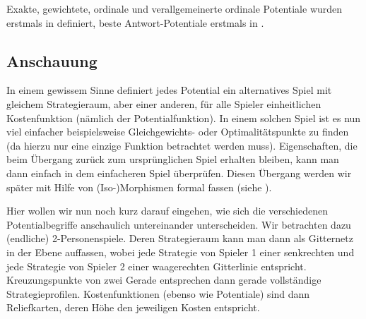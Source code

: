 Exakte, gewichtete, ordinale und verallgemeinerte ordinale Potentiale wurden erstmals in \cite{MonShap} definiert, beste Antwort-Potentiale erstmals in \cite{BestRespPot}.

\subsection{Anschauung}

In einem gewissem Sinne definiert jedes Potential ein alternatives Spiel mit gleichem Strategieraum, aber einer anderen, für alle Spieler einheitlichen Kostenfunktion (nämlich der Potentialfunktion). In einem solchen Spiel ist es nun viel einfacher beispielsweise Gleichgewichts- oder Optimalitätspunkte zu finden (da hierzu nur eine einzige Funktion betrachtet werden muss). Eigenschaften, die beim Übergang zurück zum ursprünglichen Spiel erhalten bleiben, kann man dann einfach in dem einfacheren Spiel überprüfen. Diesen Übergang werden wir später mit Hilfe von (Iso-)Morphismen formal fassen (siehe ).

Hier wollen wir nun noch kurz darauf eingehen, wie sich die verschiedenen Potentialbegriffe anschaulich untereinander unterscheiden. Wir betrachten dazu (endliche) 2-Personenspiele. Deren Strategieraum kann man dann als Gitternetz in der Ebene auffassen, wobei jede Strategie von Spieler 1 einer senkrechten und jede Strategie von Spieler 2 einer waagerechten Gitterlinie entspricht. Kreuzungspunkte von zwei Gerade entsprechen dann gerade vollständige Strategieprofilen. Kostenfunktionen (ebenso wie Potentiale) sind dann \glqq Reliefkarten\grqq{}, deren Höhe den jeweiligen Kosten entspricht. 

